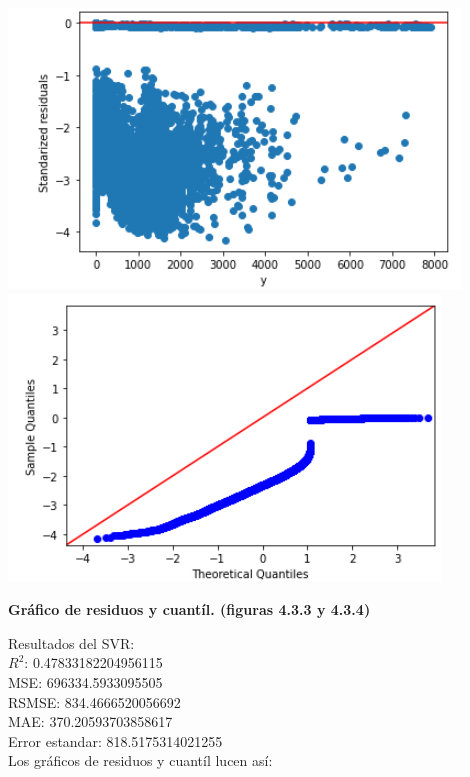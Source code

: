 \documentclass{article}
\begin{document}
    
    
    
            \includegraphics[scale=0.6]{images/residuos-discharge-MLP1.PNG} 
            \includegraphics[scale=0.6]{images/residuos-discharge-quantil2.PNG} \\
            \begin{center}
                \textbf{Gráfico de residuos y cuantíl. (figuras 4.3.3 y 4.3.4)}
            \end{center}
    
    
        Resultados del SVR:\\
        $R^2$:  0.47833182204956115\\
        MSE:  696334.5933095505\\
        RSMSE:  834.4666520056692\\
        MAE:  370.20593703858617\\
        Error estandar:  818.5175314021255\\
    
        Los gráficos de residuos y cuantíl lucen así: 
    
\end{document}
